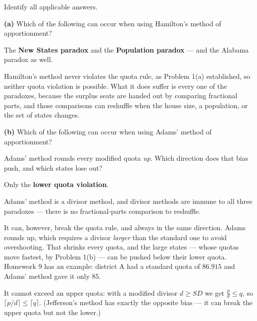 \documentclass[12pt]{ximera}
\begin{document}
\begin{problem}
Identify all applicable answers.

\begin{prompt}
\textbf{(a)} Which of the following can occur when using Hamilton's method of
apportionment?

\begin{selectAll}
\end{selectAll}

\begin{feedback}
The \textbf{New States paradox} and the \textbf{Population paradox} --- and the Alabama
paradox as well.

Hamilton's method never violates the quota rule, as Problem 1(a) established, so neither
quota violation is possible. What it does suffer is every one of the paradoxes, because
the surplus seats are handed out by comparing fractional parts, and those comparisons can
reshuffle when the house size, a population, or the set of states changes.
\end{feedback}
\end{prompt}

\begin{prompt}
\textbf{(b)} Which of the following can occur when using Adams' method of
apportionment?

\begin{selectAll}
\end{selectAll}

\begin{hint}
Adams' method rounds every modified quota \emph{up}. Which direction does that bias
push, and which states lose out?
\end{hint}

\begin{feedback}
Only the \textbf{lower quota violation}.

Adams' method is a divisor method, and divisor methods are immune to all three
paradoxes --- there is no fractional-parts comparison to reshuffle.

It can, however, break the quota rule, and always in the same direction. Adams rounds
up, which requires a divisor \emph{larger} than the standard one to avoid overshooting.
That shrinks every quota, and the large states --- whose quotas move fastest, by Problem
1(b) --- can be pushed below their lower quota. Homework 9 has an example: district A had
a standard quota of $86.915$ and Adams' method gave it only $85$.

It cannot exceed an upper quota: with a modified divisor $d \ge SD$ we get
$\frac{p}{d} \le q$, so $\lceil p/d\rceil \le \lceil q\rceil$. (Jefferson's method has
exactly the opposite bias --- it can break the upper quota but not the lower.)
\end{feedback}
\end{prompt}
\end{problem}
\end{document}
